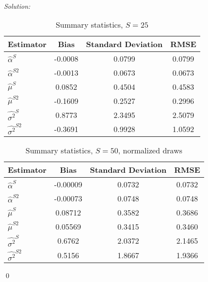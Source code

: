 \documentclass[12pt]{article}
\newenvironment{sol}
    {\emph{Solution:}
    }
    {
    \qed
    }
\begin{document}
\begin{sol}
        \begin{table}[htbp]
            \centering
            \caption{Summary statistics, $S = 25$}
              \begin{tabular}{lccc}
                  \toprule
                    Estimator                & Bias             & Standard Deviation         & RMSE           \\
                  \midrule
                    $\hat{\alpha}^S $  &  -0.0008  &  0.0799  &  0.0799  \\
                    $\hat{\alpha}^{S2}$   & -0.0013& 0.0673  &  0.0673       \\
                    $\hat{\mu}^S $     &  0.0852  &  0.4504 &  0.4583    \\
                    $\hat{\mu}^{S2}$   &  -0.1609& 0.2527 &    0.2996   \\
                    $\hat{\sigma^2}^S $  &   0.8773    &  2.3495 &   2.5079  \\
                    $\hat{\sigma^2}^{S2}$   & -0.3691 & 0.9928 &    1.0592     \\
                  \bottomrule
              \end{tabular}
            \label{tab:cf10}
          \end{table}

          \item \begin{table}[htbp]
            \centering
            \caption{Summary statistics, $S = 50$, normalized draws}
              \begin{tabular}{lccc}
                  \toprule
                    Estimator                & Bias             & Standard Deviation         & RMSE           \\
                  \midrule
                    $\hat{\alpha}^S $     &  -0.00009  & 0.0732  &   0.0732\\
                    $\hat{\alpha}^{S2}$   & -0.00073& 0.0748  &    0.0748  \\
                    $\hat{\mu}^S $     &   0.08712  & 0.3582  &   0.3686   \\
                    $\hat{\mu}^{S2}$   & 0.05569 & 0.3415 &   0.3460   \\
                    $\hat{\sigma^2}^S $     &  0.6762   &  2.0372  & 2.1465    \\
                    $\hat{\sigma^2}^{S2}$   & 0.5156 & 1.8667 &  1.9366  \\
                  \bottomrule
              \end{tabular}
            \label{tab:cf10}
          \end{table}
    

\end{sol}
\end{document}
